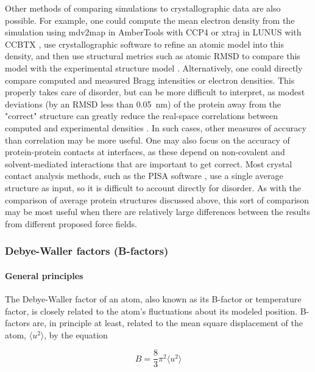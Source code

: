 \documentclass[9pt,review]{livecoms}
\begin{document}
Other methods of comparing simulations to crystallographic data are also possible.
For example, one could compute the mean electron density from the simulation using mdv2map in AmberTools with CCP4 \cite{winn_overview_2011,case_amber_2022} or xtraj in LUNUS with CCBTX \cite{grosse-kunstleve_computational_2002,wall_methods_2009}, use crystallographic software to refine an atomic model into this density, and then use structural metrics such as atomic RMSD to compare this model with the experimental structure model \cite{wych_molecular-dynamics_2023}.
Alternatively, one could directly compare computed and measured Bragg intensities or electron densities.
This properly takes care of disorder, but can be more difficult to interpret, as modest deviations (by an RMSD less than \qty{0.05}{\nano\meter}) of the protein away from the "correct" structure can greatly reduce the real-space correlations between computed and experimental densities \cite{wall_internal_2018}.
In such cases, other measures of accuracy than correlation may be more useful.
One may also focus on the accuracy of protein-protein contacts at interfaces, as these depend on non-covalent and solvent-mediated interactions that are important to get correct.
Most crystal contact analysis methods, such as the PISA software \cite{krissinel_inference_2007}, use a single average structure as input, so it is difficult to account directly for disorder.
As with the comparison of average protein structures discussed above, this sort of comparison may be most useful when there are relatively large differences between the results from different proposed force fields.

\subsubsection{Debye-Waller factors (B-factors)}
\label{sub2:b_factors}

\paragraph{General principles}

The Debye-Waller factor of an atom, also known as its B-factor or temperature factor, is closely related to the atom’s fluctuations about its modeled position.
B-factors are, in principle at least, related to the mean square displacement of the atom, $\langle u^2 \rangle$, by the equation

\begin{equation}
\label{eqn:b_factor}
B = \frac {8} {3} \pi^2 \langle u^2 \rangle
\end{equation}
\end{document}
